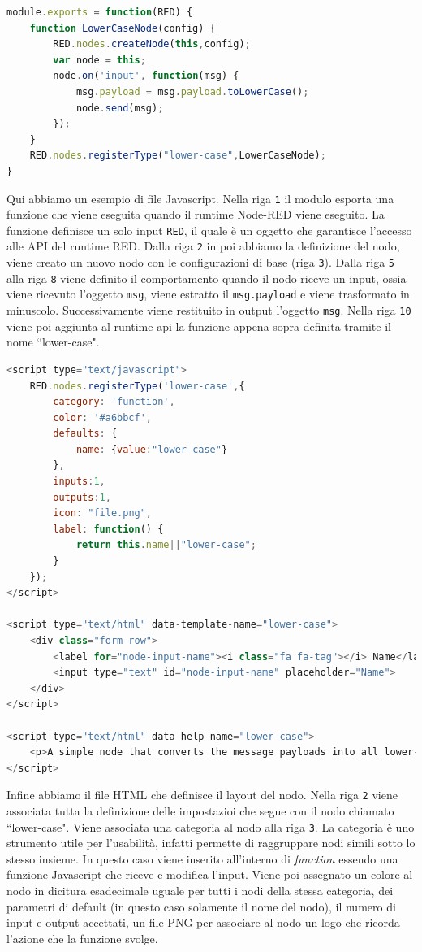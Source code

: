 \documentclass[a4paper,10pt]{memoir}
\begin{document}
\begin{lstlisting}[language=Javascript]
module.exports = function(RED) {
    function LowerCaseNode(config) {
        RED.nodes.createNode(this,config);
        var node = this;
        node.on('input', function(msg) {
            msg.payload = msg.payload.toLowerCase();
            node.send(msg);
        });
    }
    RED.nodes.registerType("lower-case",LowerCaseNode);
}
\end{lstlisting}
Qui abbiamo un esempio di file Javascript. Nella riga \texttt{1} il modulo esporta una funzione che viene eseguita quando il runtime Node-RED viene eseguito. La funzione definisce un solo input \texttt{RED}, il quale è un oggetto che garantisce l'accesso alle API del runtime RED.
Dalla riga \texttt{2} in poi abbiamo la definizione del nodo, viene creato un nuovo nodo con le configurazioni di base (riga \texttt{3}). Dalla riga \texttt{5} alla riga \texttt{8} viene definito il comportamento quando il nodo riceve un input, ossia viene ricevuto l'oggetto \texttt{msg}, viene estratto il \texttt{msg.payload} e viene trasformato in minuscolo.
Successivamente viene restituito in output l'oggetto \texttt{msg}.
Nella riga \texttt{10} viene poi aggiunta al runtime api la funzione appena sopra definita tramite il nome ``lower-case".

\begin{lstlisting}[language=Javascript]
<script type="text/javascript">
    RED.nodes.registerType('lower-case',{
        category: 'function',
        color: '#a6bbcf',
        defaults: {
            name: {value:"lower-case"}
        },
        inputs:1,
        outputs:1,
        icon: "file.png",
        label: function() {
            return this.name||"lower-case";
        }
    });
</script>

<script type="text/html" data-template-name="lower-case">
    <div class="form-row">
        <label for="node-input-name"><i class="fa fa-tag"></i> Name</label>
        <input type="text" id="node-input-name" placeholder="Name">
    </div>
</script>

<script type="text/html" data-help-name="lower-case">
    <p>A simple node that converts the message payloads into all lower-case characters</p>
</script>
\end{lstlisting}
Infine abbiamo il file HTML che definisce il layout del nodo.
Nella riga \texttt{2} viene associata tutta la definizione delle impostazioi che segue con il nodo chiamato ``lower-case".
Viene associata una categoria al nodo alla riga \texttt{3}. La categoria è uno strumento utile per l'usabilità, infatti permette di raggruppare nodi simili sotto lo stesso insieme. In questo caso viene inserito all'interno di \textit{function} essendo una funzione Javascript che riceve e modifica l'input.
Viene poi assegnato un colore al nodo in dicitura esadecimale uguale per tutti i nodi della stessa categoria, dei parametri di default (in questo caso solamente il nome del nodo), il numero di input e output accettati, un file PNG per associare al nodo un logo che ricorda l'azione che la funzione svolge.
\end{document}
